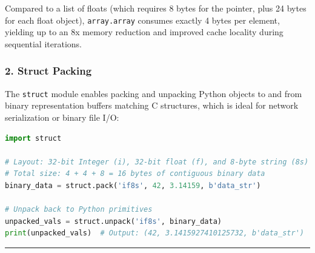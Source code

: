 Compared to a list of floats (which requires 8 bytes for the pointer,
plus 24 bytes for each float object),
\passthrough{\lstinline!array.array!} consumes exactly 4 bytes per
element, yielding up to an 8x memory reduction and improved cache
locality during sequential iterations.

\hypertarget{struct-packing}{%
\subsubsection{2. Struct Packing}\label{struct-packing}}

The \passthrough{\lstinline!struct!} module enables packing and
unpacking Python objects to and from binary representation buffers
matching C structures, which is ideal for network serialization or
binary file I/O:

\begin{lstlisting}[language=Python]
import struct

# Layout: 32-bit Integer (i), 32-bit float (f), and 8-byte string (8s)
# Total size: 4 + 4 + 8 = 16 bytes of contiguous binary data
binary_data = struct.pack('if8s', 42, 3.14159, b'data_str')

# Unpack back to Python primitives
unpacked_vals = struct.unpack('if8s', binary_data)
print(unpacked_vals)  # Output: (42, 3.1415927410125732, b'data_str')
\end{lstlisting}

\begin{center}\rule{0.5\linewidth}{0.5pt}\end{center}
